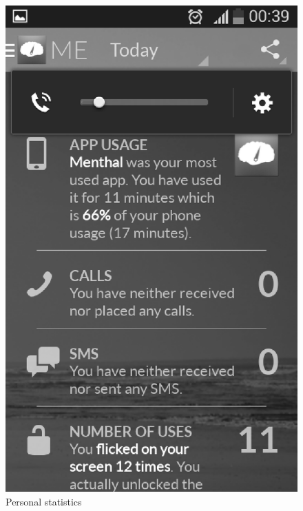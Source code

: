 \begin{figure}[h]
\begin{minipage}{.5\textwidth}
  \includegraphics [width=.8\textwidth]{images/Menthal_GUI_me}
  \caption{Personal statistics}
  \label{fig:menthal_gui_me}
\end{minipage}
\end{figure}

